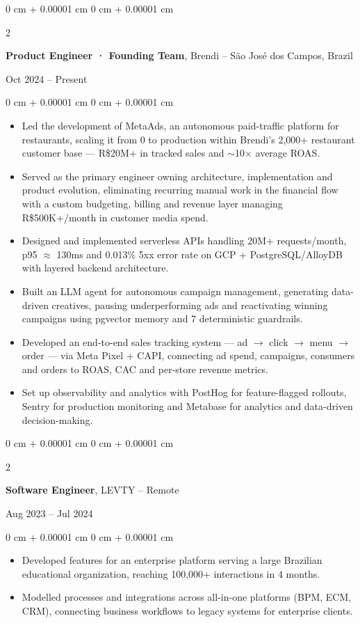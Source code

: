 \documentclass[10pt, a4paper]{article}
\newenvironment{highlights}{
    \begin{itemize}[
        topsep=0.05 cm,
        parsep=0.05 cm,
        partopsep=0pt,
        itemsep=0pt,
        leftmargin=0 cm + 10pt
    ]
}{
    \end{itemize}
}
\newenvironment{onecolentry}{
    \begin{adjustwidth}{
        0 cm + 0.00001 cm
    }{
        0 cm + 0.00001 cm
    }
}{
    \end{adjustwidth}
}
\newenvironment{twocolentry}[2][]{
    \onecolentry
    \def\secondColumn{#2}
    \setcolumnwidth{\fill, 4.5 cm}
    \begin{paracol}{2}
}{
    \switchcolumn \raggedleft \secondColumn
    \end{paracol}
    \endonecolentry
}
\begin{document}
    \begin{twocolentry}{Oct 2024 -- Present}
        \textbf{Product Engineer · Founding Team}, Brendi -- São José dos Campos, Brazil
    \end{twocolentry}
    \vspace{0.10 cm}
    \begin{onecolentry}
        \begin{highlights}
            \item Led the development of MetaAds, an autonomous paid-traffic platform for restaurants, scaling it from 0 to production within Brendi's 2,000+ restaurant customer base --- R\$20M+ in tracked sales and $\sim$10$\times$ average ROAS.
            \item Served as the primary engineer owning architecture, implementation and product evolution, eliminating recurring manual work in the financial flow with a custom budgeting, billing and revenue layer managing R\$500K+/month in customer media spend.
            \item Designed and implemented serverless APIs handling 20M+ requests/month, p95 $\approx$ 130ms and 0.013\% 5xx error rate on GCP + PostgreSQL/AlloyDB with layered backend architecture.
            \item Built an LLM agent for autonomous campaign management, generating data-driven creatives, pausing underperforming ads and reactivating winning campaigns using pgvector memory and 7 deterministic guardrails.
            \item Developed an end-to-end sales tracking system — ad $\rightarrow$ click $\rightarrow$ menu $\rightarrow$ order — via Meta Pixel + CAPI, connecting ad spend, campaigns, consumers and orders to ROAS, CAC and per-store revenue metrics.
            \item Set up observability and analytics with PostHog for feature-flagged rollouts, Sentry for production monitoring and Metabase for analytics and data-driven decision-making.
        \end{highlights}
    \end{onecolentry}

    \vspace{0.18 cm}

    \begin{twocolentry}{Aug 2023 -- Jul 2024}
        \textbf{Software Engineer}, LEVTY -- Remote
    \end{twocolentry}
    \vspace{0.10 cm}
    \begin{onecolentry}
        \begin{highlights}
            \item Developed features for an enterprise platform serving a large Brazilian educational organization, reaching 100,000+ interactions in 4 months.
            \item Modelled processes and integrations across all-in-one platforms (BPM, ECM, CRM), connecting business workflows to legacy systems for enterprise clients.
        \end{highlights}
    \end{onecolentry}
\end{document}
